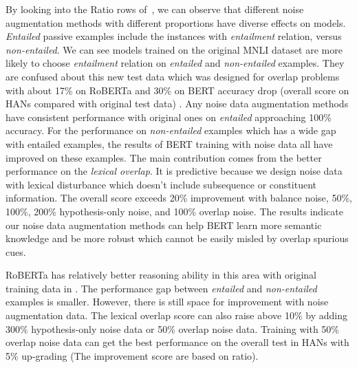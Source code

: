 By looking into the Ratio rows of~, we can observe
that different noise augmentation methods with different proportions 
have diverse effects on models.
\textit{Entailed} passive examples include the instances with \textit{entailment} 
relation, versus \textit{non-entailed}. 
We can see models trained on the original MNLI dataset are more likely 
to choose \textit{entailment} relation on \textit{entailed} and \textit{non-entailed} examples. 
They are confused about this new test data which was designed for overlap problems 
with about 17\% on RoBERTa and 30\% on BERT accuracy drop 
(overall score on HANs compared with original test data) . 
Any noise data augmentation methods have consistent performance with 
original ones on \textit{entailed} approaching 100\% accuracy. 
For the performance on \textit{non-entailed} examples which has a wide gap 
with entailed examples, the results of BERT training with noise data all have 
improved on these examples. The main contribution comes from the 
better performance on the \textit{lexical overlap}. It is predictive because 
we design noise data with lexical disturbance which doesn't include subsequence or 
constituent information. The overall score exceeds 20\% improvement with balance noise, 
50\%, 100\%, 200\%  hypothesis-only noise, and 100\% overlap noise. The results indicate 
our noise data augmentation methods can help BERT learn more semantic knowledge 
and be more robust which cannot be easily misled by overlap spurious cues.

RoBERTa has relatively better reasoning ability in this area with original training data in . 
The performance gap between \textit{entailed} and \textit{non-entailed} examples is smaller. 
However, there is still space for improvement with noise augmentation data. 
The lexical overlap score can also raise above 10\% by adding 300\% hypothesis-only noise data 
or 50\% overlap noise data. Training with 50\% overlap noise data can get 
the best performance on the overall test in HANs with 5\% up-grading (The improvement 
score are based on ratio). 






